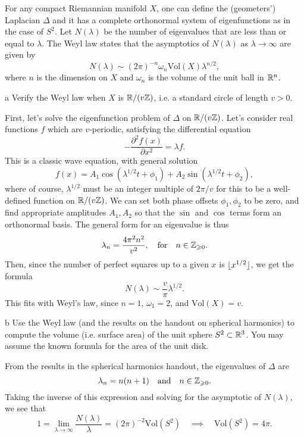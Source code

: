 \documentclass[expanded]{lkx_pset}
\begin{document}
\begin{problem}{3}
For any compact Riemannian manifold $X$, one can define the (geometers') Laplacian $\Delta$ and it has a complete orthonormal system of eigenfunctions as in the case of $S^2$. Let $N(\lambda)$ be the number of eigenvalues that are less than or equal to $\lambda$. The Weyl law states that the asymptotics of $N(\lambda)$ as $\lambda \to \infty$ are given by
\[
	N(\lambda)\sim (2\pi)^{-n}\omega_n \mathrm{Vol}(X)\lambda^{n/2},
\]
where $n$ is the dimension on $X$ and $\omega_n$ is the volume of the unit ball in $\mathbb{R}^n$.
\end{problem}

\begin{parts}
	\begin{part}{a}
		Verify the Weyl law when $X$ is $\mathbb{R}/(v\mathbb{Z})$, i.e. a standard circle of length $v>0$.
	\end{part}

	First, let's solve the eigenfunction problem of $\Delta$ on $\mathbb{R}/(v\mathbb{Z})$. Let's consider real functions $f$ which are $v$-periodic, satisfying the differential equation
	\[
		-\frac{\partial^2 f(x)}{\partial x^2} = \lambda f.
	\]
	This is a classic wave equation, with general solution
	\[
		f(x) = A_1 \cos(\lambda^{1/2} t + \phi_1) + A_2 \sin(\lambda^{1/2} t + \phi_2),
	\]
	where of course, $\lambda^{1/2}$ must be an integer multiple of $2\pi /v$ for this to be a well-defined function on $\mathbb{R}/(v\mathbb{Z})$. We can set both phase offsets $\phi_1,\phi_2$ to be zero, and find appropriate amplitudes $A_1, A_2$ so that the $\sin$ and $\cos$ terms form an orthonormal basis. The general form for an eigenvalue is thus
	\[
		\lambda_n = \frac{4\pi^2 n^2}{v^2},\quad\textrm{for}\quad n\in \mathbb{Z}_{\geqslant 0}.
	\]
	Then, since the number of perfect squares up to a given $x$ is $\lfloor x^{1/2}\rfloor$, we get the formula
	\[
		N(\lambda) \sim \frac{v}{\pi}\lambda^{1/2}.
	\]
	This fits with Weyl's law, since $n=1$, $\omega_1=2$, and $\textrm{Vol}(X)=v$.

	\begin{part}{b}
		Use the Weyl law (and the results on the handout on spherical harmonics) to compute the volume (i.e. surface area) of the unit sphere $S^2\subset \mathbb{R}^3$. You may assume the known formula for the area of the unit disk.
	\end{part}

	From the results in the spherical harmonics handout, the eigenvalues of $\Delta$ are
	\[
		\lambda_n = n(n+1)\quad\textrm{and}\quad n\in \mathbb{Z}_{\geqslant 0}.
	\]
	Taking the inverse of this expression and solving for the asymptotic of $N(\lambda)$, we see that
	\[
		1=\lim_{\lambda\to\infty} \frac{N(\lambda)}{\lambda} = (2\pi)^{-2}\textrm{Vol}(S^2)\quad\implies\quad \textrm{Vol}(S^2) = 4\pi.
	\]
\end{parts}
\end{document}
